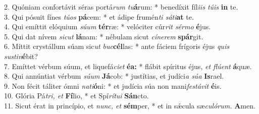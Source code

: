 2. Quóniam confortávit séras portá\textit{rum tu}\textbf{á}rum: * benedíxit fíl\textit{iis túis} \textbf{in} te.\\
3. Qui pósuit fínes \textit{túos} \textbf{pá}cem: * et ádipe frumén\textit{ti sáti}\textbf{at} te.\\
4. Qui emíttit elóquium \textit{súum} \textbf{tér}ræ: * velóciter cúr\textit{rit sérmo} \textbf{é}jus.\\
5. Qui dat nívem \textit{sicut} \textbf{lá}nam: * nébulam sicut \textit{cínerem} \textbf{spár}git.\\
6. Míttit crystállum súam sic\textit{ut buc}\textbf{cél}las: * ante fáciem frígoris éjus \textit{quis sustin}\textbf{é}bit?\\
7. Emíttet vérbum súum, et liquefá\textit{ciet} \textbf{éa:} * flábit spíritus éjus, \textit{et flúent} \textbf{á}quæ.\\
8. Qui annúntiat vérbum \textit{súum} \textbf{Já}cob: * justítias, et judíci\textit{a súa} \textbf{Is}rael.\\
9. Non fécit táliter ómni \textit{nati}\textbf{ó}ni: * et judícia súa non mani\textit{festávit} \textbf{é}is.\\
10. Glória Pá\textit{tri, et} \textbf{Fí}lio, * et Spí\textit{rítui} \textbf{Sán}cto.\\
11. Sicut érat in princípio, et \textit{nunc, et} \textbf{sém}per, * et in sǽcula sæ\textit{culórum.} \textbf{A}men.
